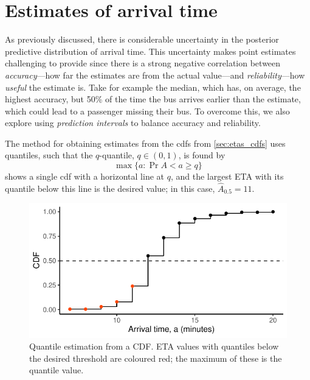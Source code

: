 \section{Estimates of arrival time}
\label{sec:eta_estimates}

As previously discussed, there is considerable uncertainty in the posterior predictive distribution of arrival time. This uncertainty makes point estimates challenging to provide since there is a strong negative correlation between \emph{accuracy}---how far the estimates are from the actual value---and \emph{reliability}---how \emph{useful} the estimate is. Take for example the median, which has, on average, the highest accuracy, but 50\% of the time the bus arrives earlier than the estimate, which could lead to a passenger missing their bus. To overcome this, we also explore using \emph{prediction intervals} to balance accuracy and reliability.

The method for obtaining estimates from the \glspl{cdf} from \cref{sec:etas_cdfs} uses quantiles, such that the $q$-quantile, $q\in(0,1)$, is found by
\begin{equation}
\label{eq:eta_calc_quantile}
\max\{a : \Pr{A < a} \geq q\}
\end{equation}
 shows a single \gls{cdf} with a horizontal line at $q$, and the largest ETA with its quantile below this line is the desired value; in this case, $\hat A_{0.5} = 11$.


\begin{knitrout}
\color{fgcolor}\begin{figure}

{\centering \includegraphics[width=.8\textwidth]{figure/eta_calc_quantile-1} 

}

\caption[Quantile estimation from a CDF]{Quantile estimation from a CDF. ETA values with quantiles below the desired threshold are coloured red; the maximum of these is the quantile value.}\label{fig:eta_calc_quantile}
\end{figure}


\end{knitrout}




